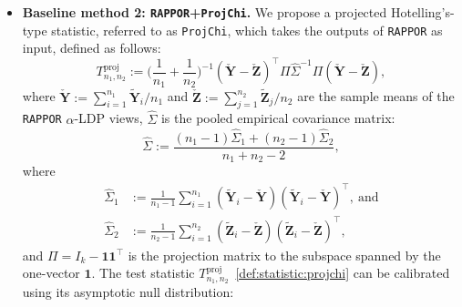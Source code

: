 \documentclass[twoside,11pt]{article}
\newcommand{\vectorize}[1]{\mathbf{#1}}
\newcommand{\rvY}{Y}
\newcommand{\rVecY}{\vectorize{\rvY}}
\newcommand{\rvZ}{Z}
\newcommand{\rVecZ}{\vectorize{\rvZ}}
\newcommand{\alphabetSize}{k} %
\newcommand{\sampleSize}{n}
\newcommand{\privacyParameter}{\alpha} %
\begin{document}
\begin{appendix}
\begin{itemize}
	\item \textbf{Baseline method 2: \texttt{RAPPOR}+\texttt{ProjChi}.}
	We propose a projected Hotelling's-type statistic, referred to as \texttt{ProjChi}, which takes the outputs of \texttt{RAPPOR} as input, defined as follows: 
	\begin{equation}\label{def:statistic:projchi}
		T^{\mathrm{proj}}_{\sampleSize_1, \sampleSize_2}
		:=\biggl( \dfrac{1}{\sampleSize_1}+\dfrac{1}{\sampleSize_2} \biggr)^{-1}
		(
		\check{\rVecY} 
		-
		\check{\rVecZ} 
		)^\top
		\Pi
		\hat{\Sigma}^{-1}
		\Pi
		(
		\check{\rVecY} 
		-
		\check{\rVecZ}
		),
	\end{equation}
	where
	$
	\check{\rVecY} 
	:=
	\sum_{i=1}^{n_1}
	\tilde{\rVecY}_i
	/\sampleSize_1$
	and
	$
	\check{\rVecZ} 
	:=
	\sum_{j=1}^{n_2}
	\tilde{\rVecZ}_j
	/\sampleSize_2
	$
	are the sample means of the \texttt{RAPPOR} $\privacyParameter$-LDP views,
	$\hat{\Sigma}$ is the pooled empirical covariance matrix:
	\begin{equation}
		\hat{\Sigma} := \frac{(n_1 - 1) \hat{\Sigma}_1 + (n_2 - 1) \hat{\Sigma}_2 }{n_1 + n_2 - 2},
	\end{equation}
	where
	\begin{align*}
		\hat{\Sigma}_1 &:= \frac{1}{n_1 - 1} \sum_{i=1}^{n_1} (\tilde{\mathbf{Y}}_i - \check{\mathbf{Y}})(\tilde{\mathbf{Y}}_i - \check{\mathbf{Y}})^\top,~\text{and}
		\\
		\hat{\Sigma}_2 &:= \frac{1}{n_2 - 1} \sum_{i=1}^{n_2} (\tilde{\mathbf{Z}}_i - \check{\mathbf{Z}})(\tilde{\mathbf{Z}}_i - \check{\mathbf{Z}})^\top,
	\end{align*}
	and $\Pi = I_\alphabetSize - \mathbf{1} \mathbf{1}^\top$ is the projection matrix to the subspace spanned by the one-vector $\mathbf{1}$.
	The test statistic  $T^{\mathrm{proj}}_{\sampleSize_1, \sampleSize_2}$~\eqref{def:statistic:projchi} can  be calibrated using its asymptotic null distribution:
	

\end{itemize}
\end{appendix}
\end{document}

